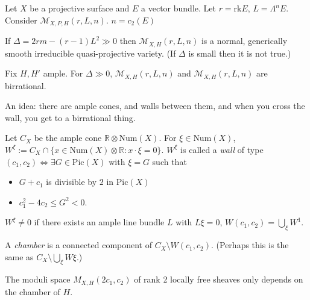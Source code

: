 Let $X$ be a projective surface and $E$ a vector bundle. 
Let $r = \text{rk} E$, $L = \Lambda^{n}E$. Consider
$\mathcal{M}_{X,P,H}(r,L,n)$.
$n=c_2(E)$ 

\begin{theorem}
\label{theorem-moduli-space-that-is-normal-generaically-smooth-irreducible-
quasi-projective-variety}
If $\Delta=2rm-(r-1)L^2 \gg 0$ then $\mathcal{M}_{X,H}(r,L,n)$ is a normal,
generically smooth irreducible quasi-projective variety. (If $\Delta$ is small
then it is not true.)
\end{theorem}

\begin{theorem}
\label{theorem-birrational-moduli-spaces}
Fix $H,H'$ ample. For $\Delta \gg 0$, $\mathcal{M}_{X,H}(r,L,n)$ and
$\mathcal{M}_{X,H}(r,L,n)$ are birrational.
\end{theorem}

An idea: there are ample cones, and walls between them, and when you cross the
wall, you get to a birrational thing.

\begin{definition}
\label{definition-wall}
Let $C_X$ be the ample cone $\mathbb{R} \otimes \text{Num}(X)$. For 
$\xi \in\text{Num}(X)$, 
$W^\xi:=C_X \cap \{x \in \text{Num}(X) \otimes\mathbb{R}:x\cdot\xi=0\}$. 
$W^\xi$ is called a {\it wall} of type 
$(c_1,c_2) \iff \exists G \in\text{Pic}(X)$ with $\xi = G$ such that 
\begin{itemize}
\item $G+c_1$ is divisible by $2$ in $\text{Pic}(X)$
\item $c_1^2-4c_2 \leq G^2 <0$.
\end{itemize}
\end{definition}

\begin{remark}
\label{remark-wall-not-zero-if-exists-ample-with-condition}
$W^\xi \neq 0$ if there exists an ample line bundle $L$ with $L\xi =0$,
$W(c_1,c_2)=\bigcup_{\xi}W^1$.
\end{remark}

\begin{definition}
\label{definition-chamber}
A {\it chamber} is a connected component of $C_X\setminus W(c_1,c_2)$. (Perhaps
this is the same as $C_X \setminus \bigcup_{\xi}W\xi$.)
\end{definition}

\begin{theorem}[Qin]
\label{theorem-Qin}
The moduli space $M_{X,H}(2c_1,c_2)$ of rank 2 locally free sheaves only depends
on the chamber of $H$.
\end{theorem}

